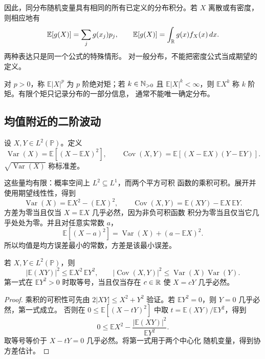 因此，同分布随机变量具有相同的所有已定义的分布积分。若 \(X\)
离散或有密度，则相应地有
\[
 \mathbb E[g(X)]=\sum_jg(x_j)p_j,
 \qquad\mathbb E[g(X)]=\int_{\mathbb{R}} g(x)f_X(x)\,dx.
\]
两种表达只是同一个公式的特殊情形。
对一般分布，不能把密度公式当成期望的定义。

对 \(p>0\)，称 \(\mathbb E|X|^p\) 为 \(p\) 阶绝对矩；若
\(k\in\mathbb{N}_{>0}\) 且 \(\mathbb E|X|^k<\infty\)，则
\(\mathbb E X^k\) 称 \(k\) 阶矩。有限个矩只记录分布的一部分信息，
通常不能唯一确定分布。

\subsection{均值附近的二阶波动}

\begin{definition}\label{def:variance-covariance}
设 \(X,Y\in L^2(\mathbb P)\)。定义
\[
 \operatorname{Var}(X)=\mathbb E[(X-\mathbb E X)^2],\qquad
 \operatorname{Cov}(X,Y)=\mathbb E[(X-\mathbb E X)(Y-\mathbb E Y)].
\]
\(\sqrt{\operatorname{Var}(X)}\) 称标准差。
\end{definition}

这些量均有限：概率空间上 \(L^2\subseteq L^1\)，而两个平方可积
函数的乘积可积。展开并使用期望线性性，得到
\begin{equation}\label{eq:variance-covariance-expansion}
 \operatorname{Var}(X)=\mathbb E X^2-(\mathbb E X)^2,\qquad
 \operatorname{Cov}(X,Y)=\mathbb E(XY)-\mathbb E X\,\mathbb E Y.
\end{equation}
方差为零当且仅当 \(X=\mathbb E X\) 几乎必然，因为非负可积函数
积分为零当且仅当它几乎处处为零。并且对任意实常数 \(a\)，
\[
 \mathbb E[(X-a)^2]=\operatorname{Var}(X)+(a-\mathbb E X)^2.
\]
所以均值是均方误差最小的常数，方差是该最小误差。

\begin{proposition}
\label{prop:probability-cauchy-schwarz}
若 \(X,Y\in L^2(\mathbb P)\)，则
\[
 |\mathbb E(XY)|^2\le\mathbb E X^2\,\mathbb E Y^2,
 \qquad
 |\operatorname{Cov}(X,Y)|^2
 \le\operatorname{Var}(X)\operatorname{Var}(Y).
\]
第一式在 \(\mathbb E Y^2>0\) 时取等号，当且仅当存在 \(c\in\mathbb{R}\)
使 \(X=cY\) 几乎必然。
\end{proposition}
\begin{proof}
乘积的可积性可先由 \(2|XY|\le X^2+Y^2\) 验证。若
\(\mathbb E Y^2=0\)，则 \(Y=0\) 几乎必然，第一式成立。
否则在 \(0\le\mathbb E[(X-tY)^2]\) 中取
\(t=\mathbb E(XY)/\mathbb E Y^2\)，得到
\[
 0\le\mathbb E X^2-\frac{|\mathbb E(XY)|^2}{\mathbb E Y^2}.
\]
取等号等价于 \(X-tY=0\) 几乎必然。将第一式用于两个中心化
随机变量，得到协方差估计。
\end{proof}

